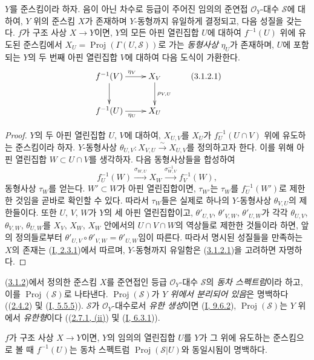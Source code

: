 \begin{proposition}[3.1.2]
\label{II.3.1.2-ko}
$Y$를 준스킴이라 하자. 음이 아닌 차수로 등급이 주어진 임의의 준연접
$\mathcal{O}_Y$-대수 $\mathcal{S}$에 대하여, $Y$ 위의 준스킴 $X$가
존재하며 $Y$-동형까지 유일하게 결정되고, 다음 성질을 갖는다. $f$가
구조 사상 $X\to Y$이면, $Y$의 모든 아핀 열린집합 $U$에 대하여
$f^{-1}(U)$ 위에 유도된 준스킴에서
$X_U=\operatorname{Proj}(\Gamma(U,\mathcal{S}))$로 가는
\emph{동형사상} $\eta_U$가 존재하며, $U$에 포함되는 $Y$의 두 번째
아핀 열린집합 $V$에 대하여 다음 도식이 가환한다.
\[
\label{II.3.1.2.1-ko}
  \xymatrix{
    f^{-1}(V)\ar[r]^{\eta_V}\ar[d]
    & X_V\ar[d]^{\rho_{V,U}}\\
    f^{-1}(U)\ar[r]_{\eta_U}
    & X_U
  }
\tag{3.1.2.1}
\]
\end{proposition}

\begin{proof}
$Y$의 두 아핀 열린집합 $U$, $V$에 대하여, $X_{U,V}$를 $X_U$가
$f_U^{-1}(U\cap V)$ 위에 유도하는 준스킴이라 하자. $Y$-동형사상
$\theta_{U,V}:X_{V,U}\xrightarrow{\sim}X_{U,V}$를 정의하고자 한다.
이를 위해 아핀 열린집합 $W\subset U\cap V$를 생각하자. 다음
동형사상들을 합성하여
\[
  f_U^{-1}(W)\xrightarrow{\sigma_{W,U}}X_W
  \xrightarrow{\sigma_{W,V}^{-1}}f_V^{-1}(W),
\]
동형사상 $\tau_W$를 얻는다. $W'\subset W$가 아핀 열린집합이면,
$\tau_{W'}$는 $\tau_W$를 $f_U^{-1}(W')$로 제한한 것임을 곧바로
확인할 수 있다. 따라서 $\tau_W$들은 실제로 하나의 $Y$-동형사상
$\theta_{V,U}$의 제한들이다. 또한 $U$, $V$, $W$가 $Y$의 세 아핀
열린집합이고, $\theta'_{U,V}$, $\theta'_{V,W}$,
$\theta'_{U,W}$가 각각 $\theta_{U,V}$, $\theta_{V,W}$,
$\theta_{U,W}$를 $X_V$, $X_W$, $X_W$ 안에서의
$U\cap V\cap W$의 역상들로 제한한 것들이라 하면, 앞의 정의들로부터
$\theta'_{U,V}\circ\theta'_{V,W}=\theta'_{U,W}$임이 따른다. 따라서
명시된 성질들을 만족하는 $X$의 존재는
(\hyperref[I.2.3.1-ko]{I, 2.3.1})에서 따르며, $Y$-동형까지 유일함은
(\hyperref[II.3.1.2.1-ko]{3.1.2.1})을 고려하면 자명하다.
\end{proof}

\begin{env}[3.1.3]
\label{II.3.1.3-ko}
(\hyperref[II.3.1.2-ko]{3.1.2})에서 정의한 준스킴 $X$를 준연접인
등급 $\mathcal{O}_Y$-대수 $\mathcal{S}$의 \emph{동차 스펙트럼}이라
하고, 이를 $\operatorname{Proj}(\mathcal{S})$로 나타낸다.
$\operatorname{Proj}(\mathcal{S})$가 \emph{$Y$ 위에서 분리되어 있음}은
명백하다 ((\hyperref[II.2.4.2-ko]{2.4.2}) 및
(\hyperref[I.5.5.5-ko]{I, 5.5.5})). $\mathcal{S}$가
$\mathcal{O}_Y$-대수로서 \emph{유한 생성}이면
(\hyperref[I.9.6.2-ko]{I, 9.6.2}),
$\operatorname{Proj}(\mathcal{S})$는 $Y$ 위에서 \emph{유한형}이다
((\hyperref[II.2.7.1-ko]{2.7.1, (ii)}) 및
(\hyperref[I.6.3.1-ko]{I, 6.3.1})).

$f$가 구조 사상 $X\to Y$이면, $Y$의 임의의 열린집합 $U$를 $Y$가
그 위에 유도하는 준스킴으로 볼 때 $f^{-1}(U)$는 동차 스펙트럼
$\operatorname{Proj}(\mathcal{S}|U)$와 동일시됨이 명백하다.
\end{env}

